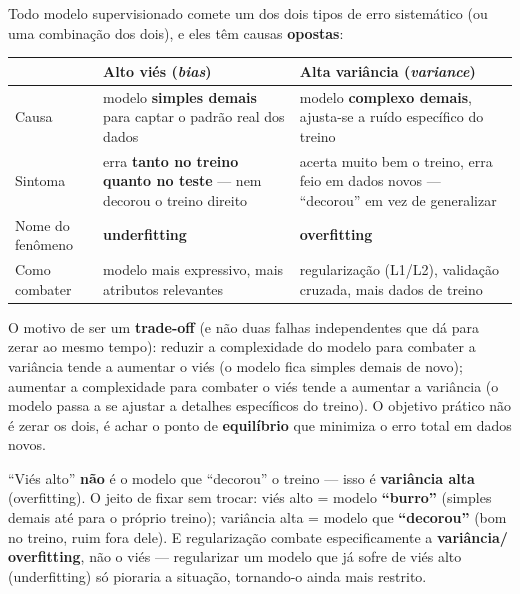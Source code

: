 \begin{conceito}
Todo modelo supervisionado comete um dos dois tipos de erro sistemático
(ou uma combinação dos dois), e eles têm causas \textbf{opostas}:

\begin{center}
\begin{tabular}{@{}p{2.6cm}p{4.4cm}p{4.4cm}@{}}
\toprule
& \textbf{Alto viés (\textit{bias})} & \textbf{Alta variância (\textit{variance})} \\
\midrule
Causa & modelo \textbf{simples demais} para captar o padrão real dos
dados & modelo \textbf{complexo demais}, ajusta-se a ruído específico do
treino \\
Sintoma & erra \textbf{tanto no treino quanto no teste} --- nem decorou o
treino direito & acerta muito bem o treino, erra feio em dados novos ---
“decorou” em vez de generalizar \\
Nome do fenômeno & \textbf{underfitting} & \textbf{overfitting} \\
Como combater & modelo mais expressivo, mais atributos relevantes &
regularização (L1/L2), validação cruzada, mais dados de treino \\
\bottomrule
\end{tabular}
\end{center}

O motivo de ser um \textbf{trade-off} (e não duas falhas independentes que
dá para zerar ao mesmo tempo): reduzir a complexidade do modelo para
combater a variância tende a aumentar o viés (o modelo fica simples
demais de novo); aumentar a complexidade para combater o viés tende a
aumentar a variância (o modelo passa a se ajustar a detalhes específicos
do treino). O objetivo prático não é zerar os dois, é achar o ponto de
\textbf{equilíbrio} que minimiza o erro total em dados novos.
\end{conceito}

\begin{cuidado}
“Viés alto” \textbf{não} é o modelo que “decorou” o treino --- isso é
\textbf{variância alta} (overfitting). O jeito de fixar sem trocar: viés
alto = modelo \textbf{“burro”} (simples demais até para o próprio treino);
variância alta = modelo que \textbf{“decorou”} (bom no treino, ruim fora
dele). E regularização combate especificamente a \textbf{variância/
overfitting}, não o viés --- regularizar um modelo que já sofre de viés
alto (underfitting) só pioraria a situação, tornando-o ainda mais
restrito.
\end{cuidado}

